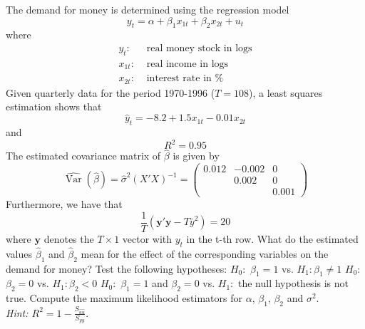 \documentclass{article}
\begin{document}
\begin{Exercise}[title=(Money Demand)]
The demand for money is determined using the regression model
$$ y_t = \alpha + \beta_1 x_{1t} + \beta_2 x_{2t} + u_t$$
where
\begin{align*}
	y_t:    & \text{ real money stock in logs}\\
	x_{1t}: & \text{ real income in logs}\\
	x_{2t}: & \text{ interest rate in \%}
\end{align*} 
Given quarterly data for the period 1970-1996 ($T=108$), a least squares estimation shows that
$$\hat{y}_t = -8.2 +1.5x_{1t} - 0.01 x_{2t}$$
and $$R^2 = 0.95$$
The estimated covariance matrix of $\hat{\beta}$ is given by
$$\widehat{\operatorname{Var}}(\hat{\beta}) = \hat{\sigma}^2 (X'X)^{-1} = 
\begin{pmatrix} 
0.012 & -0.002 & 0\\
& 0.002  & 0\\
&        & 0.001			
\end{pmatrix}$$
Furthermore, we have that $$\frac{1}{T} (\mathbf{y}'\mathbf{y} - T \bar{y}^2)=20$$ where $\mathbf{y}$ denotes the $T\times1$ vector with $y_t$ in the t-th row.
\Question What do the estimated values $\hat{\beta}_1$ and $\hat{\beta}_2$ mean for the effect of the corresponding variables on the demand for money?
\Question Test the following hypotheses:
	\subQuestion $H_0:$ $\beta_1=1$ vs. $H_1: \beta_1 \neq1$
	\subQuestion $H_0:$ $\beta_2=0$ vs. $H_1: \beta_2 <0$
	\subQuestion $H_0:$ $\beta_1=1$ and $\beta_2=0$ vs. $H_1:$ the null hypothesis is not true.
\Question Compute the maximum likelihood estimators for $\alpha$, $\beta_1$, $\beta_2$ and $\sigma^2$.\\
\textit{Hint: $R^2=1-\frac{S_{\hat{u}\hat{u}}}{S_{yy}}$}.
	
\end{Exercise}
\end{document}
